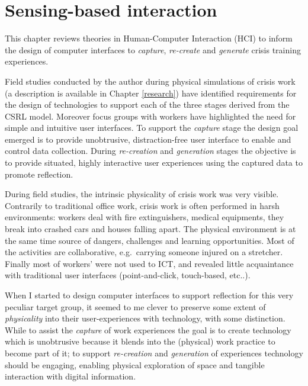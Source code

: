 \chapter{Sensing-based interaction}\label{interaction}


This chapter reviews theories in Human-Computer Interaction (HCI) to inform the design of computer interfaces to \emph{capture}, \emph{re-create} and \emph{generate} crisis training experiences.

Field studies conducted by the author during physical simulations of crisis work (a description is available in Chapter \ref{research}) have identified requirements for the design of technologies to support each of the three stages derived from the CSRL model. Moreover focus groups with workers have highlighted the need for simple and intuitive user interfaces. To support the \emph{capture} stage the design goal emerged is to provide unobtrusive, distraction-free user interface to enable and control data collection. During \emph{re-creation} and \emph{generation} stages the objective is to provide situated, highly interactive user experiences using the captured data to promote reflection.

During field studies, the intrinsic physicality of crisis work was very visible. Contrarily to traditional office work, crisis work is often performed in harsh environments: workers deal with fire extinguishers, medical equipments, they break into crashed cars and houses falling apart. The physical environment is at the same time source of dangers, challenges and learning opportunities. Most of the activities are collaborative, e.g.~carrying someone injured on a stretcher. Finally most of workers' were not used to ICT, and revealed little acquaintance with traditional user interfaces (point-and-click, touch-based, etc..).

When I started to design computer interfaces to support reflection for this very peculiar target group, it seemed to me clever to preserve some extent of \emph{physicality} into their user-experiences with technology, with some distinction. While to assist the \emph{capture} of work experiences the goal is to create technology which is unobtrusive because it blends into the (physical) work practice to become part of it; to support \emph{re-creation} and \emph{generation} of experiences technology should be engaging, enabling physical exploration of space and tangible interaction with digital information.

